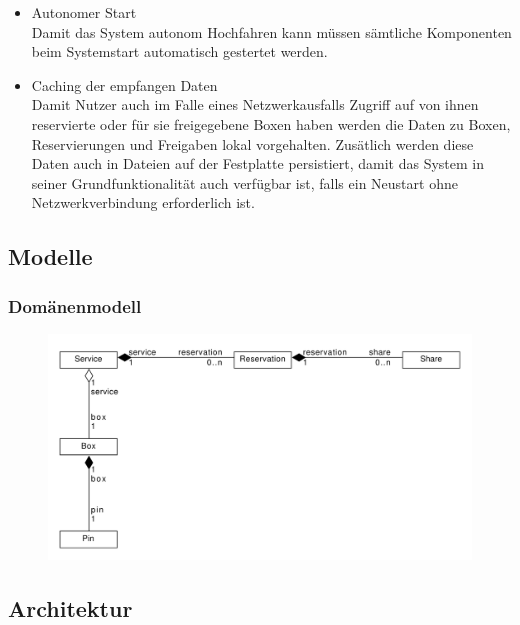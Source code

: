 \documentclass[openright,twoside,a4paper]{scrartcl}
\begin{document}
\begin{itemize}
                    \item Autonomer Start \\
                    Damit das System autonom Hochfahren kann müssen sämtliche Komponenten beim Systemstart automatisch gestertet werden.

                    \item Caching der empfangen Daten \\
                    Damit Nutzer auch im Falle eines Netzwerkausfalls Zugriff auf von ihnen reservierte oder für sie freigegebene Boxen haben werden die Daten zu Boxen, Reservierungen und Freigaben lokal vorgehalten. Zusätlich werden diese Daten auch in Dateien auf der Festplatte persistiert, damit das System in seiner Grundfunktionalität auch verfügbar ist, falls ein Neustart ohne Netzwerkverbindung erforderlich ist.
                \end{itemize}
            
        \subsection{Modelle}
                \subsubsection{Domänenmodell}
                \begin{figure}[h]
                    \centering
                    \includegraphics[scale=0.7]{Bilder/Domain_17112019.pdf}
                \end{figure}

        \subsection{Architektur}
\end{document}
